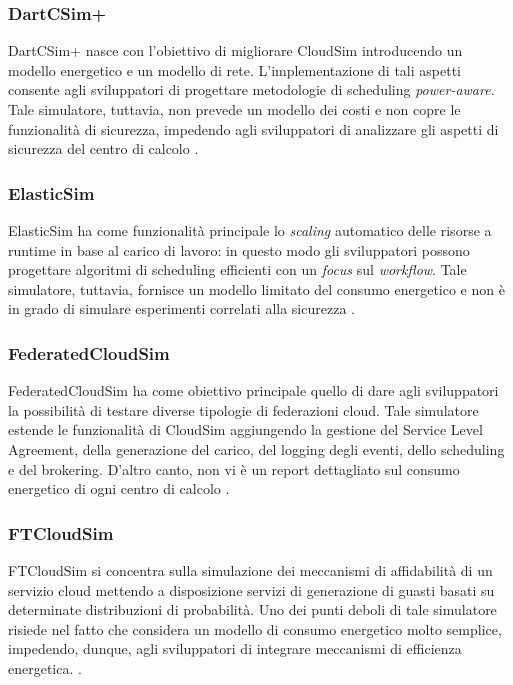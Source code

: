 {\subsubsection*{DartCSim+}
DartCSim+ nasce con l'obiettivo di migliorare CloudSim introducendo un modello energetico e un modello di rete. L'implementazione di tali aspetti consente agli sviluppatori di progettare metodologie di scheduling \emph{power-aware}. Tale simulatore, tuttavia, non prevede un modello dei costi e non copre le funzionalità di sicurezza, impedendo agli sviluppatori di analizzare gli aspetti di sicurezza del centro di calcolo \cite{mansouri2020cloud}. 
\subsubsection*{ElasticSim}
ElasticSim \cite{cai2017elasticsim} ha come funzionalità principale lo \emph{scaling} automatico delle risorse a runtime in base al carico di lavoro: in questo modo gli sviluppatori possono progettare algoritmi di scheduling efficienti con un \emph{focus} sul \emph{workflow}. Tale simulatore, tuttavia, fornisce un modello limitato del consumo energetico e non è in grado di simulare esperimenti correlati alla sicurezza \cite{mansouri2020cloud}. 
\subsubsection*{FederatedCloudSim}
FederatedCloudSim \cite{kohne2014federatedcloudsim} ha come obiettivo principale quello di dare agli sviluppatori la possibilità di testare diverse tipologie di federazioni cloud. Tale simulatore estende le funzionalità di CloudSim aggiungendo la gestione del Service Level Agreement, della generazione del carico, del logging degli eventi, dello scheduling e del brokering. D'altro canto, non vi è un report dettagliato sul consumo energetico di ogni centro di calcolo \cite{mansouri2020cloud}.  
\subsubsection*{FTCloudSim}
FTCloudSim \cite{zhou2013ftcloudsim} si concentra sulla simulazione dei meccanismi di affidabilità di un servizio cloud mettendo a disposizione servizi di generazione di guasti basati su determinate distribuzioni di probabilità. Uno dei punti deboli di tale simulatore risiede nel fatto che considera un modello di consumo energetico molto semplice, impedendo, dunque, agli sviluppatori di integrare meccanismi di efficienza energetica. \cite{mansouri2020cloud}. 
}
